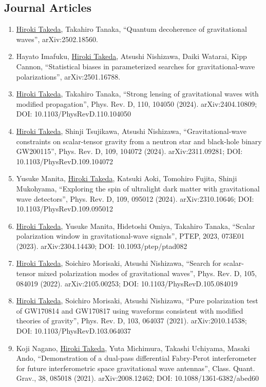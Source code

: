 \documentclass[uplatex, 12pt]{article}
\begin{document}
\subsection*{Journal Articles}
\begin{enumerate}
\item \uline{Hiroki Takeda}, Takahiro Tanaka, “Quantum decoherence of gravitational waves”, arXiv:2502.18560.
\item Hayato Imafuku, \uline{Hiroki Takeda}, Atsushi Nishizawa, Daiki Watarai, Kipp Cannon, “Statistical biases in parameterized searches for gravitational-wave polarizations”, arXiv:2501.16788.
\item \uline{Hiroki Takeda}, Takahiro Tanaka, “Strong lensing of gravitational waves with modified propagation”, Phys. Rev. D, 110, 104050 (2024). arXiv:2404.10809; DOI: 10.1103/PhysRevD.110.104050
\item \uline{Hiroki Takeda}, Shinji Tsujikawa, Atsushi Nishizawa, “Gravitational-wave constraints on scalar-tensor gravity from a neutron star and black-hole binary GW200115”, Phys. Rev. D, 109, 104072 (2024). arXiv:2311.09281; DOI: 10.1103/PhysRevD.109.104072
\item Yusuke Manita, \uline{Hiroki Takeda}, Katsuki Aoki, Tomohiro Fujita, Shinji Mukohyama, “Exploring the spin of ultralight dark matter with gravitational wave detectors”, Phys. Rev. D, 109, 095012 (2024). arXiv:2310.10646; DOI: 10.1103/PhysRevD.109.095012
\item \uline{Hiroki Takeda}, Yusuke Manita, Hidetoshi Omiya, Takahiro Tanaka, “Scalar polarization window in gravitational-wave signals”, PTEP, 2023, 073E01 (2023). arXiv:2304.14430; DOI: 10.1093/ptep/ptad082
\item \uline{Hiroki Takeda}, Soichiro Morisaki, Atsushi Nishizawa, “Search for scalar-tensor mixed polarization modes of gravitational waves”, Phys. Rev. D, 105, 084019 (2022). arXiv:2105.00253; DOI: 10.1103/PhysRevD.105.084019
\item \uline{Hiroki Takeda}, Soichiro Morisaki, Atsushi Nishizawa, “Pure polarization test of GW170814 and GW170817 using waveforms consistent with modified theories of gravity”, Phys. Rev. D, 103, 064037 (2021). arXiv:2010.14538; DOI: 10.1103/PhysRevD.103.064037
\item Koji Nagano, \uline{Hiroki Takeda}, Yuta Michimura, Takashi Uchiyama, Masaki Ando, “Demonstration of a dual-pass differential Fabry-Perot interferometer for future interferometric space gravitational wave antennas”, Class. Quant. Grav., 38, 085018 (2021). arXiv:2008.12462; DOI: 10.1088/1361-6382/abed60

\end{enumerate}
\end{document}
